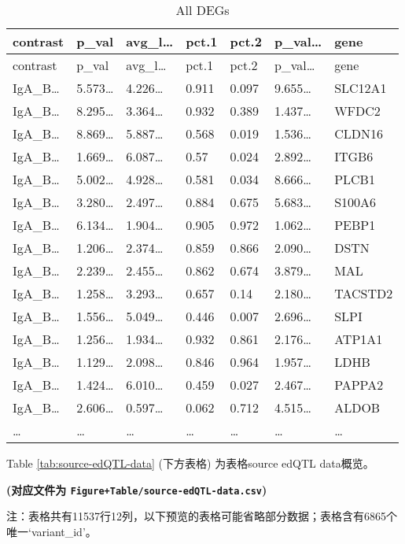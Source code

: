 \documentclass[
]{article}
\begin{document}
\begin{longtable}[]{@{}lllllll@{}}
\caption{\label{tab:All-DEGs}All DEGs}\tabularnewline
\toprule
contrast & p\_val & avg\_l\ldots{} & pct.1 & pct.2 & p\_val\ldots{} & gene\tabularnewline
\midrule
\endfirsthead
\toprule
contrast & p\_val & avg\_l\ldots{} & pct.1 & pct.2 & p\_val\ldots{} & gene\tabularnewline
\midrule
\endhead
IgA\_B\ldots{} & 5.573\ldots{} & 4.226\ldots{} & 0.911 & 0.097 & 9.655\ldots{} & SLC12A1\tabularnewline
IgA\_B\ldots{} & 8.295\ldots{} & 3.364\ldots{} & 0.932 & 0.389 & 1.437\ldots{} & WFDC2\tabularnewline
IgA\_B\ldots{} & 8.869\ldots{} & 5.887\ldots{} & 0.568 & 0.019 & 1.536\ldots{} & CLDN16\tabularnewline
IgA\_B\ldots{} & 1.669\ldots{} & 6.087\ldots{} & 0.57 & 0.024 & 2.892\ldots{} & ITGB6\tabularnewline
IgA\_B\ldots{} & 5.002\ldots{} & 4.928\ldots{} & 0.581 & 0.034 & 8.666\ldots{} & PLCB1\tabularnewline
IgA\_B\ldots{} & 3.280\ldots{} & 2.497\ldots{} & 0.884 & 0.675 & 5.683\ldots{} & S100A6\tabularnewline
IgA\_B\ldots{} & 6.134\ldots{} & 1.904\ldots{} & 0.905 & 0.972 & 1.062\ldots{} & PEBP1\tabularnewline
IgA\_B\ldots{} & 1.206\ldots{} & 2.374\ldots{} & 0.859 & 0.866 & 2.090\ldots{} & DSTN\tabularnewline
IgA\_B\ldots{} & 2.239\ldots{} & 2.455\ldots{} & 0.862 & 0.674 & 3.879\ldots{} & MAL\tabularnewline
IgA\_B\ldots{} & 1.258\ldots{} & 3.293\ldots{} & 0.657 & 0.14 & 2.180\ldots{} & TACSTD2\tabularnewline
IgA\_B\ldots{} & 1.556\ldots{} & 5.049\ldots{} & 0.446 & 0.007 & 2.696\ldots{} & SLPI\tabularnewline
IgA\_B\ldots{} & 1.256\ldots{} & 1.934\ldots{} & 0.932 & 0.861 & 2.176\ldots{} & ATP1A1\tabularnewline
IgA\_B\ldots{} & 1.129\ldots{} & 2.098\ldots{} & 0.846 & 0.964 & 1.957\ldots{} & LDHB\tabularnewline
IgA\_B\ldots{} & 1.424\ldots{} & 6.010\ldots{} & 0.459 & 0.027 & 2.467\ldots{} & PAPPA2\tabularnewline
IgA\_B\ldots{} & 2.606\ldots{} & 0.597\ldots{} & 0.062 & 0.712 & 4.515\ldots{} & ALDOB\tabularnewline
\ldots{} & \ldots{} & \ldots{} & \ldots{} & \ldots{} & \ldots{} & \ldots{}\tabularnewline
\bottomrule
\end{longtable}

Table \ref{tab:source-edQTL-data} (下方表格) 为表格source edQTL data概览。

\textbf{(对应文件为 \texttt{Figure+Table/source-edQTL-data.csv})}

\begin{center}\begin{tcolorbox}[colback=gray!10, colframe=gray!50, width=0.9\linewidth, arc=1mm, boxrule=0.5pt]注：表格共有11537行12列，以下预览的表格可能省略部分数据；表格含有6865个唯一`variant\_id'。
\end{tcolorbox}
\end{center}
\end{document}

